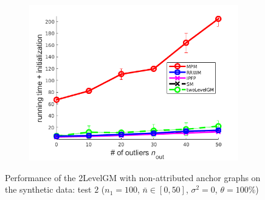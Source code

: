 \begin{figure}[h]
\begin{subfigure}[b]{0.3\textwidth}
		\includegraphics[scale=0.25]{"chapter3/fig/SyntheticTest/no_descr/Results_v4.3.3/Test3/time_summary_avg10t"} 
	\end{subfigure} 	
	\caption[Performance of the 2LevelGM with non-attributed anchor graphs on the synthetic data (test $2$)]{Performance of the 2LevelGM with non-attributed anchor graphs on the synthetic data: test $2$ ($n_1=100$, $\bar{n}\in[0,50]$, $\sigma^2=0$, $\theta=100\%$)}
	\label{fig:synTest2_ver433}
\end{figure}
\vspace{-20pt}
